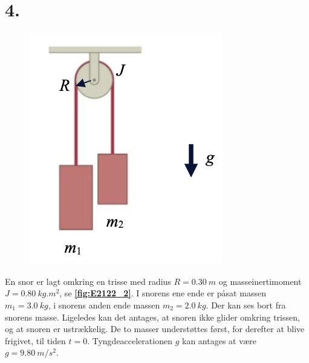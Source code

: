 \documentclass[12pt]{article}
\theoremstyle{definition}
\begin{document}
\section*{4.}
\begin{figure} [ht]
  \centering
  \caption{}
  \includegraphics[width=0.5\linewidth]{../figures/E2122_2.png}
  \label{fig:E2122_2}
\end{figure}

En snor er lagt omkring en trisse med radius $R = \qty{0,30}{m}$ og masseinertimoment $J = \qty{0,80}{kg.m^2}$, se \textbf{\autoref{fig:E2122_2}}. I snorens ene ende er påsat massen $m_1 = \qty{3,0}{kg}$, i snorens anden ende massen $m_2 = \qty{2,0}{kg}$. Der kan ses bort fra snorens masse. Ligeledes kan det antages, at snoren ikke glider omkring trissen, og at snoren er ustrækkelig. De to masser understøttes først, for derefter at blive frigivet, til tiden $t = 0$. Tyngdeaccelerationen $g$ kan antages at være $g = \qty{9,80}{m\per s^2}$.
\end{document}
